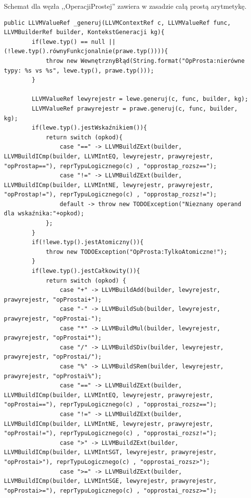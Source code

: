 Schemat dla węzła ,,OperacjiProstej'' zawiera w zasadzie całą prostą arytmetykę.

\begin{lstlisting}[basicstyle=\scriptsize]
    public LLVMValueRef _generuj(LLVMContextRef c, LLVMValueRef func, LLVMBuilderRef builder, KontekstGeneracji kg){
        if(lewe.typ() == null || (!lewe.typ().równyFunkcjonalnie(prawe.typ()))){
            throw new WewnętrznyBłąd(String.format("OpProsta:nierówne typy: %s vs %s", lewe.typ(), prawe.typ()));
        }

        LLVMValueRef lewyrejestr = lewe.generuj(c, func, builder, kg);
        LLVMValueRef prawyrejestr = prawe.generuj(c, func, builder, kg);
        if(lewe.typ().jestWskaźnikiem()){
            return switch (opkod){
                case "==" -> LLVMBuildZExt(builder, LLVMBuildICmp(builder, LLVMIntEQ, lewyrejestr, prawyrejestr, "opProstap=="), reprTypuLogicznego(c) , "opprostap_rozsz==");
                case "!=" -> LLVMBuildZExt(builder, LLVMBuildICmp(builder, LLVMIntNE, lewyrejestr, prawyrejestr, "opProstap!="), reprTypuLogicznego(c) , "opprostap_rozsz!=");
                default -> throw new TODOException("Nieznany operand dla wskaźnika:"+opkod);
            };
        }
        if(!lewe.typ().jestAtomiczny()){
            throw new TODOException("OpProsta:TylkoAtomiczne!");
        }
        if(lewe.typ().jestCałkowity()){
            return switch (opkod) {
                case "+" -> LLVMBuildAdd(builder, lewyrejestr, prawyrejestr, "opProstai+");
                case "-" -> LLVMBuildSub(builder, lewyrejestr, prawyrejestr, "opProstai-");
                case "*" -> LLVMBuildMul(builder, lewyrejestr, prawyrejestr, "opProstai*");
                case "/" -> LLVMBuildSDiv(builder, lewyrejestr, prawyrejestr, "opProstai/");
                case "%" -> LLVMBuildSRem(builder, lewyrejestr, prawyrejestr, "opProstai%");
                case "==" -> LLVMBuildZExt(builder, LLVMBuildICmp(builder, LLVMIntEQ, lewyrejestr, prawyrejestr, "opProstai=="), reprTypuLogicznego(c) , "opprostai_rozsz==");
                case "!=" -> LLVMBuildZExt(builder, LLVMBuildICmp(builder, LLVMIntNE, lewyrejestr, prawyrejestr, "opProstai!="), reprTypuLogicznego(c) , "opprostai_rozsz!=");
                case ">" -> LLVMBuildZExt(builder, LLVMBuildICmp(builder, LLVMIntSGT, lewyrejestr, prawyrejestr, "opProstai>"), reprTypuLogicznego(c) , "opprostai_rozsz>");
                case ">=" -> LLVMBuildZExt(builder, LLVMBuildICmp(builder, LLVMIntSGE, lewyrejestr, prawyrejestr, "opProstai>="), reprTypuLogicznego(c) , "opprostai_rozsz>=");

\end{lstlisting}
